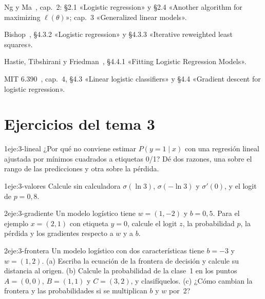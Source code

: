 \begin{lecturas}
\item Ng y Ma~\cite{cs229}, cap.~2: §2.1 «Logistic regression» y §2.4 «Another algorithm for maximizing $\ell(\theta)$»; cap.~3 «Generalized linear models».
\item Bishop~\cite{bishop}, §4.3.2 «Logistic regression» y §4.3.3 «Iterative reweighted least squares».
\item Hastie, Tibshirani y Friedman~\cite{esl}, §4.4.1 «Fitting Logistic Regression Models».
\item MIT 6.390~\cite{mit6390}, cap.~4, §4.3 «Linear logistic classifiers» y §4.4 «Gradient descent for logistic regression».
\end{lecturas}

\section*{Ejercicios del tema 3}

\begin{ejercicio}{1}{eje:3-lineal}
¿Por qué no conviene estimar $P(y=1\mid x)$ con una regresión lineal ajustada por mínimos cuadrados a etiquetas 0/1? Dé dos razones, una sobre el rango de las predicciones y otra sobre la pérdida.
\end{ejercicio}

\begin{ejercicio}{1}{eje:3-valores}
Calcule sin calculadora $\sigma(\ln 3)$, $\sigma(-\ln 3)$ y $\sigma'(0)$, y el logit de $p=0{,}8$.
\end{ejercicio}

\begin{ejercicio}{2}{eje:3-gradiente}
Un modelo logístico tiene $w=(1,-2)$ y $b=0{,}5$. Para el ejemplo $x=(2,1)$ con etiqueta $y=0$, calcule el logit $z$, la probabilidad $p$, la pérdida y los gradientes respecto a $w$ y a $b$.
\end{ejercicio}

\begin{ejercicio}{2}{eje:3-frontera}
Un modelo logístico con dos características tiene $b=-3$ y $w=(1,2)$. (a) Escriba la ecuación de la frontera de decisión y calcule su distancia al origen. (b) Calcule la probabilidad de la clase~1 en los puntos $A=(0,0)$, $B=(1,1)$ y $C=(3,2)$, y clasifíquelos. (c) ¿Cómo cambian la frontera y las probabilidades si se multiplican $b$ y $w$ por~2?
\end{ejercicio}

